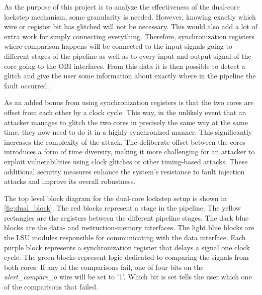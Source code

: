 
As the purpose of this project is to analyze the effectiveness of the dual-core lockstep mechanism, some granularity is needed. However, knowing exactly which wire or register bit has glitched will not be necessary. This would also add a lot of extra work for simply connecting everything. Therefore, synchronization registers where comparison happens will be connected to the input signals going to different stages of the pipeline as well as to every input and output signal of the core going to the OBI interfaces. From this data it is then possible to detect a glitch and give the user some information about exactly where in the pipeline the fault occurred.

As an added bonus from using synchronization registers is that the two cores are offset from each other by a clock cycle. This way, in the unlikely event that an attacker manages to glitch the two cores in precisely the same way at the same time, they now need to do it in a highly synchronized manner. This significantly increases the complexity of the attack. The deliberate offset between the cores introduces a form of time diversity, making it more challenging for an attacker to exploit vulnerabilities using clock glitches or other timing-based attacks. These additional security measures enhance the system's resistance to fault injection attacks and improve its overall robustness.

The top level block diagram for the dual-core lockstep setup is shown in \autoref{fig:dual_block}. The red blocks represent a stage in the pipeline. The yellow rectangles are the registers between the different pipeline stages. The dark blue blocks are the data- and instruction-memory interfaces. The light blue blocks are the LSU modules responsible for communicating with the data interface. Each purple block represents a synchronization register that delays a signal one clock cycle. The green blocks represent logic dedicated to comparing the signals from both cores. If any of the comparisons fail, one of four bits on the \textit{alert\_compare\_o} wire will be set to '1'. Which bit is set tells the user which one of the comparisons that failed.  

